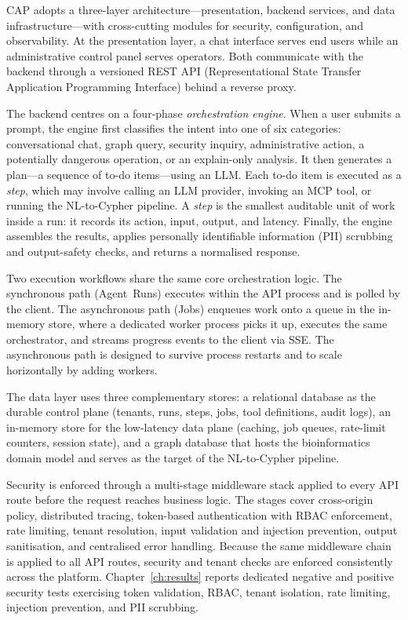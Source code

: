 \documentclass[a4paper]{sapthesis}
\begin{document}
CAP adopts a three-layer architecture---presentation, backend services, and
data infrastructure---with cross-cutting modules for security, configuration,
and observability.  At the presentation layer, a chat interface serves end
users while an administrative control panel serves operators.  Both
communicate with the backend through a versioned REST API
(Representational State Transfer Application Programming Interface) behind
a reverse proxy.

The backend centres on a four-phase \emph{orchestration engine}.  When a
user submits a prompt, the engine first classifies the intent into one of
six categories: conversational chat, graph query, security inquiry,
administrative action, a potentially dangerous operation, or an
explain-only analysis.  It then generates a plan---a sequence of to-do
items---using an LLM.  Each to-do item is executed as a \emph{step}, which
may involve calling an LLM provider, invoking an MCP tool, or running the
NL-to-Cypher pipeline.  A \emph{step} is the smallest auditable unit of
work inside a run: it records its action, input, output, and latency.
Finally, the engine assembles the results, applies personally
identifiable information (PII) scrubbing and output-safety checks, and
returns a normalised response.

Two execution workflows share the same core orchestration logic.
The synchronous path (Agent~Runs) executes within the API process and is
polled by the client.  The asynchronous path (Jobs) enqueues work onto a
queue in the in-memory store, where a dedicated worker process picks it up, executes the
same orchestrator, and streams progress events to the client via SSE.  The
asynchronous path is designed to survive process restarts and to scale
horizontally by adding workers.

The data layer uses three complementary stores: a relational database as
the durable control plane (tenants, runs, steps, jobs, tool definitions,
audit logs), an in-memory store for the low-latency data plane (caching,
job queues, rate-limit counters, session state), and a graph database that
hosts the bioinformatics domain model and serves as the target of the
NL-to-Cypher pipeline.

Security is enforced through a multi-stage middleware stack applied to
every API route before the request reaches business logic.  The stages
cover cross-origin policy, distributed tracing, token-based authentication
with RBAC enforcement, rate limiting, tenant resolution, input validation
and injection prevention, output sanitisation, and centralised error
handling.  Because the same middleware chain is applied to all API
routes, security and tenant checks are enforced consistently across the
platform.  Chapter~\ref{ch:results} reports dedicated negative and
positive security tests exercising token validation, RBAC, tenant
isolation, rate limiting, injection prevention, and PII scrubbing.
\end{document}
